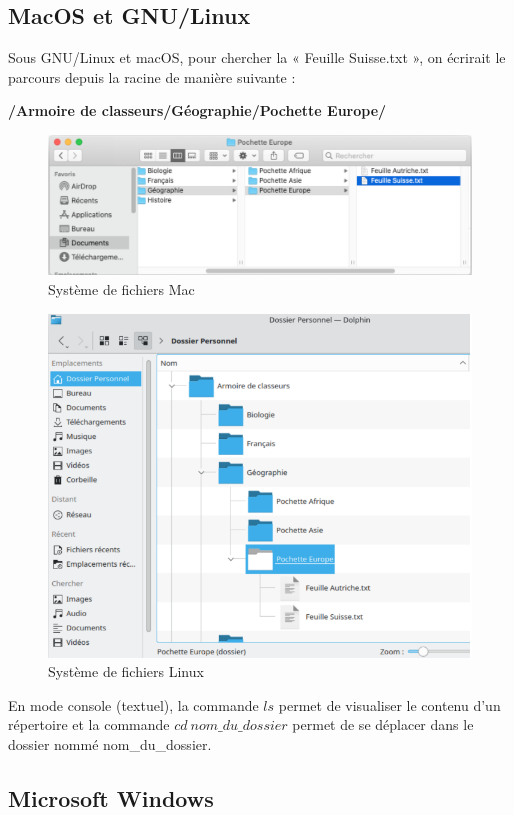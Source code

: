 \documentclass[11pt, a4paper]{book}
\begin{document}
\subsection{MacOS et GNU/Linux}
Sous GNU/Linux et macOS, pour chercher la « Feuille Suisse.txt », on écrirait le parcours depuis la racine de manière suivante :

\begin{center}
{ \bf /Armoire de classeurs/Géographie/Pochette Europe/
}
\end{center}
\begin{figure}[h!]
         \centering
         \includegraphics[width=\linewidth]{images/fichierMac}
        \caption{Système de fichiers Mac}
\end{figure}

\begin{figure}[h!]
         \centering
    \includegraphics[width=0.7\linewidth]{images/fichiersLinux.png}
    \caption{Système de fichiers Linux}
\end{figure}

En mode console (textuel), la commande $ls$ permet de visualiser le contenu d'un répertoire et la commande $cd\ nom\_du\_dossier$ permet de se déplacer dans le dossier nommé nom\_du\_dossier.

\subsection{Microsoft Windows}
\end{document}
